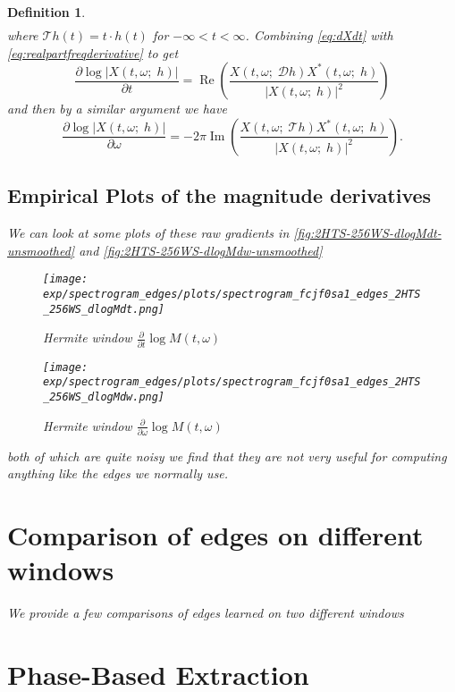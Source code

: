 \documentclass[english]{article}
\newtheorem{defn}{Definition}[section]
\begin{document}
\begin{defn}
\begin{align}
\end{align}
where $\mathcal{T}h(t) = t\cdot h(t)$ for $-\infty<t<\infty$.  Combining \autoref{eq:dXdt} with \autoref{eq:realpartfreqderivative}
to get 
\begin{equation}
\frac{\partial \log |X(t,\omega;\; h)|}{\partial t} = \operatorname{Re}\left(\frac{X(t,\omega ;\; \mathcal{D}h) X^*(t,\omega;\; h)}{|X(t,\omega;\; h)|^2}\right)
\end{equation}
and then by a similar argument we have
\begin{equation}\label{eq:frequency-edges-fast-form}
\frac{\partial \log |X(t,\omega;\; h)|}{\partial \omega} = -2\pi\operatorname{Im}\left(\frac{X(t,\omega ;\; \mathcal{T}h) X^*(t,\omega;\; h)}{|X(t,\omega;\; h)|^2}\right).
\end{equation}

\subsection{Empirical Plots of the magnitude derivatives}

We can look at some plots of these raw gradients in \autoref{fig:2HTS-256WS-dlogMdt-unsmoothed} and \autoref{fig:2HTS-256WS-dlogMdw-unsmoothed}
\begin{figure}
\centering
\texttt{[image: exp/spectrogram\_edges/plots/spectrogram\_fcjf0sa1\_edges\_2HTS\_256WS\_dlogMdt.png]}
\caption{Hermite window $\frac{\partial}{\partial t}\log M(t,\omega)$}
\label{fig:2HTS-256WS-dlogMdt-unsmoothed}
\end{figure}
\begin{figure}
\centering
\texttt{[image: exp/spectrogram\_edges/plots/spectrogram\_fcjf0sa1\_edges\_2HTS\_256WS\_dlogMdw.png]}
\caption{Hermite window $\frac{\partial}{\partial \omega}\log M(t,\omega)$}
\label{fig:2HTS-256WS-dlogMdw-unsmoothed}
\end{figure}
both of which are quite noisy we find that they are not very useful
for computing anything like the edges we normally use.


\section{Comparison of edges on different windows}

We provide a few comparisons of edges learned on two different windows



\section{Phase-Based Extraction}


\end{defn}
\end{document}
